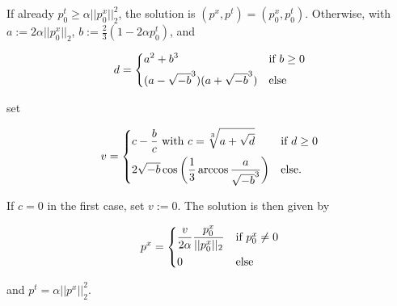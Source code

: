 
            \begin{algorithm}


                If already $p_{0}^{t} \ge \alpha ||p_{0}^{x}||_{2}^{2}$, the solution is $(p^{x}, p^{t}) = (p_{0}^{x}, p_{0}^{t})$. Otherwise, with $a := 2 \alpha ||p_{0}^{x}||_{2}$, $b := \frac{2}{3} (1 - 2 \alpha p_{0}^{t})$, and

                    \[
                        d =
                            \begin{dcases*}
                                a^{2} + b^{3} & \textnormal{if $b \ge 0$}\\
                                (a - \sqrt{-b}^{3})(a + \sqrt{-b}^{3}) & \textnormal{else}
                            \end{dcases*}
                    \]

                set

                    \[
                        v =
                            \begin{dcases*}
                                c - \frac{b}{c} \,\, \textnormal{with} \,\, c = \sqrt[3]{a + \sqrt{d}} & \textnormal{if $d \ge 0$}\\
                                2 \sqrt{-b} \cos \bigg( \frac{1}{3} \arccos \frac{a}{\sqrt{-b}^{3}} \bigg) & \textnormal{else}.
                            \end{dcases*}
                    \]

                If $c = 0$ in the first case, set $v := 0$. The solution is then given by

                    \[
                        p^{x} =
                            \begin{dcases*}
                                \frac{v}{2\alpha} \frac{p_{0}^{x}}{||p_{0}^{x}||_{2}} & \textnormal{if $p_{0}^{x} \ne 0$}\\
                                0 & \textnormal{else}
                            \end{dcases*}
                    \]

                and $p^{t} = \alpha ||p^{x}||_{2}^{2}$.
            \end{algorithm}

